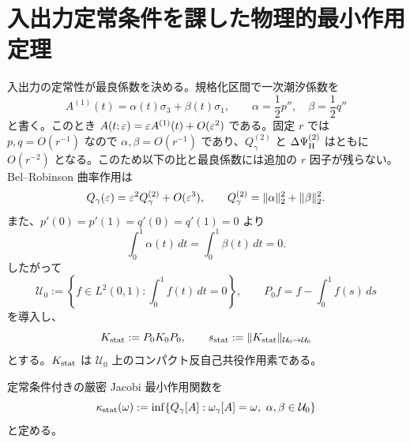 \section{入出力定常条件を課した物理的最小作用定理}
入出力の定常性が最良係数を決める。規格化区間で一次潮汐係数を
\[
A^{(1)}(t)=\alpha(t)\sigma_3+\beta(t)\sigma_1,\qquad
\alpha=\frac12p'',\quad \beta=\frac12q''
\]
と書く。このとき $A(t;\varepsilon)=\varepsilon A^{(1)}(t)+O(\varepsilon^2)$ である。固定 $r$ では $p,q=O(r^{-1})$ なので $\alpha,\beta=O(r^{-1})$ であり、$Q_\gamma^{(2)}$ と $\Delta\Psi_{\rm H}^{(2)}$ はともに $O(r^{-2})$ となる。このため以下の比と最良係数には追加の $r$ 因子が残らない。Bel--Robinson 曲率作用は
\begin{equation}
Q_\gamma(\varepsilon)=\varepsilon^2Q_\gamma^{(2)}+O(\varepsilon^3),\qquad
Q_\gamma^{(2)}=\|\alpha\|_2^2+\|\beta\|_2^2.
\label{eq:Q-leading}
\end{equation}
また、$p'(0)=p'(1)=q'(0)=q'(1)=0$ より
\begin{equation}
\int_0^1\alpha(t)\,dt=\int_0^1\beta(t)\,dt=0.
\label{eq:mean-zero}
\end{equation}
したがって
\begin{equation}
\mathcal U_0:=\left\{f\in L^2(0,1):\int_0^1 f(t)\,dt=0\right\},\qquad
P_0f=f-\int_0^1f(s)\,ds
\label{eq:U0}
\end{equation}
を導入し、
\begin{equation}
K_{\rm stat}:=P_0K_0P_0,
\qquad s_{\rm stat}:=\|K_{\rm stat}\|_{\mathcal U_0\to\mathcal U_0}
\label{eq:Kstat}
\end{equation}
とする。$K_{\rm stat}$ は $\mathcal U_0$ 上のコンパクト反自己共役作用素である。

定常条件付きの厳密 Jacobi 最小作用関数を
\begin{equation}
\kappa_{\rm stat}(\omega):=
\inf\{Q_\gamma[A]:\omega_\gamma[A]=\omega,\ \alpha,\beta\in\mathcal U_0\}
\label{eq:kappa-stat}
\end{equation}
と定める。

